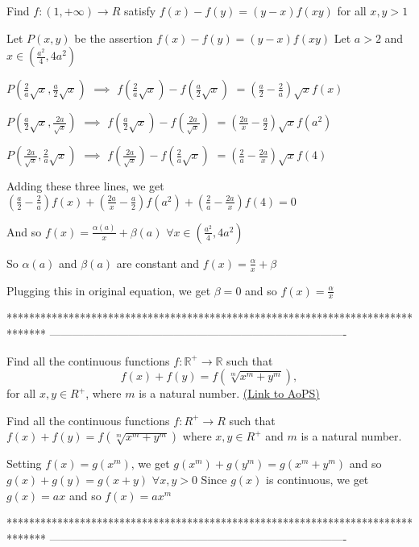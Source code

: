 \begin{solution}
	\begin{tcolorbox}Find $f:(1, +\infty ) \rightarrow R $ satisfy
$f(x)-f(y)=(y-x)f(xy)$ for all $x,y >1 $\end{tcolorbox}
Let $P(x,y)$ be the assertion $f(x)-f(y)=(y-x)f(xy)$
Let $a>2$ and $x\in(\frac {a^2}4,4a^2)$

$P(\frac 2a\sqrt x,\frac a2\sqrt x)$ $\implies$ $f(\frac 2a\sqrt x)-f(\frac a2\sqrt x)$ $=(\frac a2-\frac 2a)\sqrt xf(x)$

$P(\frac a2\sqrt x,\frac{2a}{\sqrt x})$ $\implies$ $f(\frac a2\sqrt x)-f(\frac{2a}{\sqrt x})$ $=(\frac {2a}x-\frac a2)\sqrt xf(a^2)$

$P(\frac{2a}{\sqrt x},\frac 2a\sqrt x)$ $\implies$ $f(\frac{2a}{\sqrt x})-f(\frac 2a\sqrt x)$ $=(\frac 2a-\frac{2a}x)\sqrt xf(4)$

Adding these three lines, we get $(\frac a2-\frac 2a)f(x)+(\frac {2a}x-\frac a2)f(a^2)+(\frac 2a-\frac{2a}x)f(4)=0$

And so $f(x)=\frac{\alpha(a)}x+\beta(a)$ $\forall x\in(\frac {a^2}4,4a^2)$

So $\alpha(a)$ and $\beta(a)$ are constant and $f(x)=\frac{\alpha}x+\beta$ 

Plugging this in original equation, we get $\beta=0$ and so $\boxed{f(x)=\frac{\alpha}x}$
\end{solution}
*******************************************************************************
-------------------------------------------------------------------------------

\begin{problem}
	Find all the continuous functions $f: \mathbb R^+\to \mathbb R$ such that \[f(x)+f(y)=f(\sqrt[m]{x^m+y^m}),\] for all $x,y \in R^+$, where $m$ is a natural number.
	\flushright \href{https://artofproblemsolving.com/community/c6h384702}{(Link to AoPS)}
\end{problem}



\begin{solution}
	\begin{tcolorbox}Find all the continuous functions $f:R^+\rightarrow R$ such that $f(x)+f(y)=f(\sqrt[m]{x^m+y^m})$ where $x,y \in R^+$ and $m$  is a natural number.\end{tcolorbox}
Setting $f(x)=g(x^m)$, we get $g(x^m)+g(y^m)=g(x^m+y^m)$ and so $g(x)+g(y)=g(x+y)$ $\forall x,y>0$
Since $g(x)$ is continuous, we get $g(x)=ax$ and so $\boxed{f(x)=ax^m}$
\end{solution}
*******************************************************************************
-------------------------------------------------------------------------------

